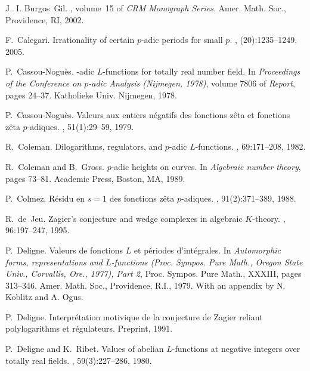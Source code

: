 \documentclass{amsart}
\begin{document}
\begin{thebibliography}{10}
J.~I. Burgos~Gil.
, volume~15 of {\em
  CRM Monograph Series}.
\newblock Amer. Math. Soc., Providence, RI, 2002.

F.~Calegari.
\newblock Irrationality of certain {$p$}-adic periods for small {$p$}.
, (20):1235--1249, 2005.

P.~Cassou-Nogu{\`e}s.
-adic {$L$}-functions for totally real number field.
\newblock In {\em Proceedings of the Conference on $p$-adic Analysis (Nijmegen,
  1978)}, volume 7806 of {\em Report}, pages 24--37. Katholieke Univ. Nijmegen,
  1978.

P.~Cassou-Nogu{\`e}s.
\newblock Valeurs aux entiers n\'egatifs des fonctions z\^eta et fonctions
  z\^eta {$p$}-adiques.
, 51(1):29--59, 1979.

R.~Coleman.
\newblock Dilogarithms, regulators, and $p$-adic {$L$}-functions.
, 69:171--208, 1982.

R.~Coleman and B.~Gross.
\newblock $p$-adic heights on curves.
\newblock In {\em Algebraic number theory}, pages 73--81. Academic Press,
  Boston, MA, 1989.

P.~Colmez.
\newblock R\'esidu en {$s=1$} des fonctions z\^eta {$p$}-adiques.
, 91(2):371--389, 1988.

R.~de~Jeu.
\newblock Zagier's conjecture and wedge complexes in algebraic ${K}$-theory.
, 96:197--247, 1995.

P.~Deligne.
\newblock Valeurs de fonctions {$L$} et p\'eriodes d'int\'egrales.
\newblock In {\em Automorphic forms, representations and $L$-functions (Proc.
  Sympos. Pure Math., Oregon State Univ., Corvallis, Ore., 1977), Part 2},
  Proc. Sympos. Pure Math., XXXIII, pages 313--346. Amer. Math. Soc.,
  Providence, R.I., 1979.
\newblock With an appendix by N. Koblitz and A. Ogus.

P.~Deligne.
\newblock Interpr{\'e}tation motivique de la conjecture de {Z}agier reliant
  polylogarithms et r{\'e}gulateurs.
\newblock Preprint, 1991.

P.~Deligne and K.~Ribet.
\newblock Values of abelian {$L$}-functions at negative integers over totally
  real fields.
, 59(3):227--286, 1980.


\end{thebibliography}
\end{document}

